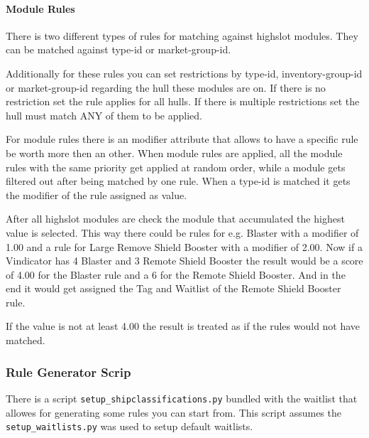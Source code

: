 \documentclass[oneside,a4paper]{article}
\begin{document}
\paragraph{Module Rules}\label{para:module_rules}
There is two different types of rules for matching against highslot modules.
They can be matched against type-id or market-group-id.

Additionally for these rules you can set restrictions by type-id, inventory-group-id or market-group-id regarding the hull these modules are on. If there is no restriction set the rule applies for all hulls.
If there is multiple restrictions set the hull must match ANY of them to be applied.

For module rules there is an modifier attribute that allows to have a specific rule be worth more then an other.
When module rules are applied, all the module rules with the same priority get applied at random order, while a module gets filtered out after being matched by one rule. When a type-id is matched it gets the modifier of the rule assigned as value.


After all highslot modules are check the module that accumulated the highest value is selected.
This way there could be rules for e.g. Blaster with a modifier of 1.00 and a rule for Large Remove Shield Booster with a modifier of 2.00. Now if a Vindicator has 4 Blaster and 3 Remote Shield Booster the result would be a score of 4.00 for the Blaster rule and a 6 for the Remote Shield Booster.
And in the end it would get assigned the Tag and Waitlist of the Remote Shield Booster rule.

If the value is not at least 4.00 the result is treated as if the rules would not have matched.

\subsubsection{Rule Generator Scrip}
There is a script \lstinline|setup_shipclassifications.py| bundled with the waitlist that allowes for generating some rules you can start from.
This script assumes the \lstinline|setup_waitlists.py| was used to setup default waitlists.
\end{document}

